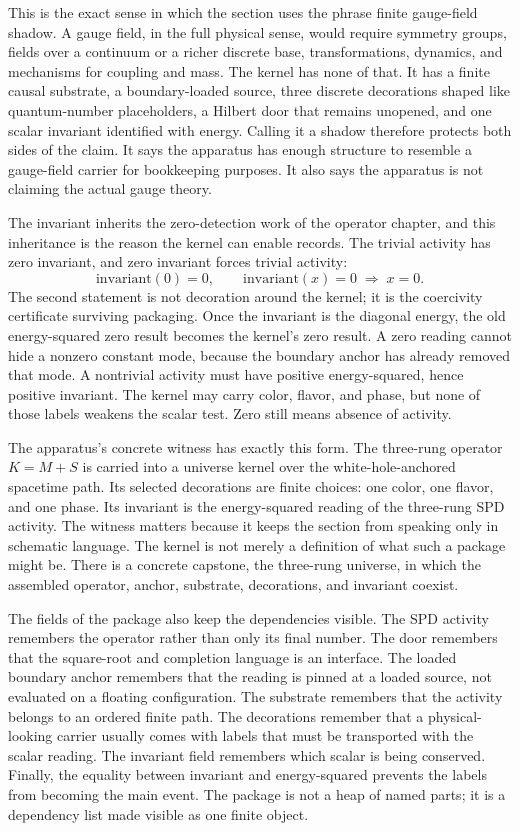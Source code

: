This is the exact sense in which the section uses the phrase finite gauge-field
shadow. A gauge field, in the full physical sense, would require symmetry
groups, fields over a continuum or a richer discrete base, transformations,
dynamics, and mechanisms for coupling and mass. The kernel has none of that. It
has a finite causal substrate, a boundary-loaded source, three discrete
decorations shaped like quantum-number placeholders, a Hilbert door that remains
unopened, and one scalar invariant identified with energy. Calling it a shadow
therefore protects both sides of the claim. It says the apparatus has enough
structure to resemble a gauge-field carrier for bookkeeping purposes. It also
says the apparatus is not claiming the actual gauge theory.

The invariant inherits the zero-detection work of the operator chapter, and this
inheritance is the reason the kernel can enable records. The trivial activity
has zero invariant, and zero invariant forces trivial activity:
\[
  \mathrm{invariant}(0) = 0,
  \qquad
  \mathrm{invariant}(x) = 0 \;\Longrightarrow\; x = 0.
\]
The second statement is not decoration around the kernel; it is the coercivity
certificate surviving packaging. Once the invariant is the diagonal energy, the
old energy-squared zero result becomes the kernel's zero result. A zero reading
cannot hide a nonzero constant mode, because the boundary anchor has already
removed that mode. A nontrivial activity must have positive energy-squared, hence
positive invariant. The kernel may carry color, flavor, and phase, but none of
those labels weakens the scalar test. Zero still means absence of activity.

The apparatus's concrete witness has exactly this form. The three-rung operator
\(K=M+S\) is carried into a universe kernel over the white-hole-anchored
spacetime path. Its selected decorations are finite choices: one color, one
flavor, and one phase. Its invariant is the energy-squared reading of the
three-rung SPD activity. The witness matters because it keeps the section from
speaking only in schematic language. The kernel is not merely a definition of
what such a package might be. There is a concrete capstone, the three-rung
universe, in which the assembled operator, anchor, substrate, decorations, and
invariant coexist.

The fields of the package also keep the dependencies visible. The SPD activity
remembers the operator rather than only its final number. The door remembers that
the square-root and completion language is an interface. The loaded boundary anchor
remembers that the reading is pinned at a loaded source, not evaluated on a
floating configuration. The substrate remembers that the activity belongs to an
ordered finite path. The decorations remember that a physical-looking carrier
usually comes with labels that must be transported with the scalar reading. The
invariant field remembers which scalar is being conserved. Finally, the equality
between invariant and energy-squared prevents the labels from becoming the main
event. The package is not a heap of named parts; it is a dependency list made
visible as one finite object.

